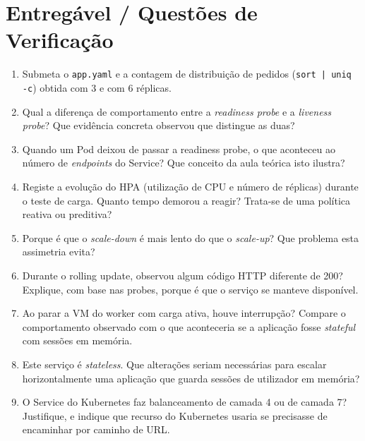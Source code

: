 \documentclass[11pt,a4paper]{article}
\begin{document}
\section{Entregável / Questões de Verificação}
\begin{enumerate}[label=\alph*)]
  \setlength\itemsep{0.2cm}
  \item Submeta o \texttt{app.yaml} e a contagem de distribuição de pedidos (\texttt{sort | uniq -c}) obtida com 3 e com 6 réplicas.
  \item Qual a diferença de comportamento entre a \emph{readiness probe} e a \emph{liveness probe}? Que evidência concreta observou que distingue as duas?
  \item Quando um Pod deixou de passar a readiness probe, o que aconteceu ao número de \emph{endpoints} do Service? Que conceito da aula teórica isto ilustra?
  \item Registe a evolução do HPA (utilização de CPU e número de réplicas) durante o teste de carga. Quanto tempo demorou a reagir? Trata-se de uma política reativa ou preditiva?
  \item Porque é que o \emph{scale-down} é mais lento do que o \emph{scale-up}? Que problema esta assimetria evita?
  \item Durante o rolling update, observou algum código HTTP diferente de 200? Explique, com base nas probes, porque é que o serviço se manteve disponível.
  \item Ao parar a VM do worker com carga ativa, houve interrupção? Compare o comportamento observado com o que aconteceria se a aplicação fosse \emph{stateful} com sessões em memória.
  \item Este serviço é \emph{stateless}. Que alterações seriam necessárias para escalar horizontalmente uma aplicação que guarda sessões de utilizador em memória?
  \item O Service do Kubernetes faz balanceamento de camada 4 ou de camada 7? Justifique, e indique que recurso do Kubernetes usaria se precisasse de encaminhar por caminho de URL.
\end{enumerate}
\end{document}
